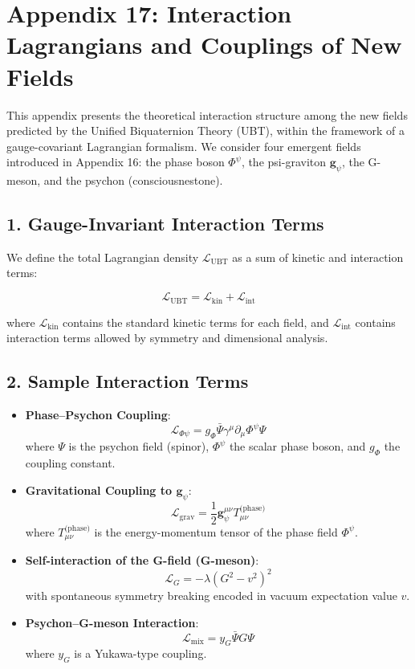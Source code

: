 
\appendix
\section*{Appendix 17: Interaction Lagrangians and Couplings of New Fields}

This appendix presents the theoretical interaction structure among the new fields predicted by the Unified Biquaternion Theory (UBT), within the framework of a gauge-covariant Lagrangian formalism. We consider four emergent fields introduced in Appendix 16: the phase boson $\Phi^\psi$, the psi-graviton $\mathbf{g}_\psi$, the G-meson, and the psychon (consciousnestone).

\subsection*{1. Gauge-Invariant Interaction Terms}

We define the total Lagrangian density $\mathcal{L}_\text{UBT}$ as a sum of kinetic and interaction terms:

\[
\mathcal{L}_\text{UBT} = \mathcal{L}_\text{kin} + \mathcal{L}_\text{int}
\]

where $\mathcal{L}_\text{kin}$ contains the standard kinetic terms for each field, and $\mathcal{L}_\text{int}$ contains interaction terms allowed by symmetry and dimensional analysis.

\subsection*{2. Sample Interaction Terms}

\begin{itemize}
  \item \textbf{Phase–Psychon Coupling}:
  \[
  \mathcal{L}_{\Phi\psi} = g_\Phi \bar{\Psi} \gamma^\mu \partial_\mu \Phi^\psi \Psi
  \]
  where $\Psi$ is the psychon field (spinor), $\Phi^\psi$ the scalar phase boson, and $g_\Phi$ the coupling constant.

  \item \textbf{Gravitational Coupling to $\mathbf{g}_\psi$}:
  \[
  \mathcal{L}_{\text{grav}} = \frac{1}{2} \mathbf{g}_\psi^{\mu\nu} T_{\mu\nu}^{\text{(phase)}}
  \]
  where $T_{\mu\nu}^{\text{(phase)}}$ is the energy-momentum tensor of the phase field $\Phi^\psi$.

  \item \textbf{Self-interaction of the G-field (G-meson)}:
  \[
  \mathcal{L}_G = -\lambda (G^2 - v^2)^2
  \]
  with spontaneous symmetry breaking encoded in vacuum expectation value $v$.

  \item \textbf{Psychon–G-meson Interaction}:
  \[
  \mathcal{L}_{\text{mix}} = y_G \bar{\Psi} G \Psi
  \]
  where $y_G$ is a Yukawa-type coupling.
\end{itemize}

